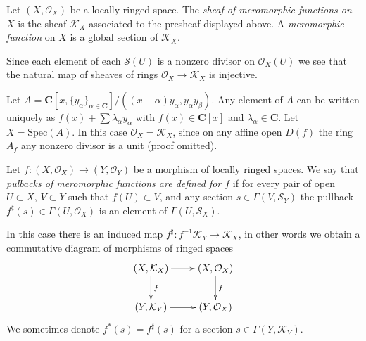 \begin{definition}
\label{definition-sheaf-meromorphic-functions}
Let $(X, \mathcal{O}_X)$ be a locally ringed space.
The {\it sheaf of meromorphic functions on $X$} is
the sheaf {\it $\mathcal{K}_X$} associated to the presheaf
displayed above. A {\it meromorphic function} on $X$
is a global section of $\mathcal{K}_X$.
\end{definition}

\noindent
Since each element of each $\mathcal{S}(U)$ is a nonzero divisor on
$\mathcal{O}_X(U)$ we see that the natural map of sheaves
of rings $\mathcal{O}_X \to \mathcal{K}_X$ is injective.

\begin{example}
\label{example-no-change}
Let $A = \mathbf{C}[x, \{y_\alpha\}_{\alpha \in \mathbf{C}}]/
((x - \alpha)y_\alpha, y_\alpha y_\beta)$. Any element of $A$
can be written uniquely as
$f(x) + \sum \lambda_\alpha y_\alpha$ with $f(x) \in \mathbf{C}[x]$
and $\lambda_\alpha \in \mathbf{C}$.
Let $X = \text{Spec}(A)$.
In this case $\mathcal{O}_X = \mathcal{K}_X$, since on
any affine open $D(f)$ the ring $A_f$ any nonzero divisor is
a unit (proof omitted).
\end{example}

\begin{definition}
\label{definition-pullback-meromorphic-sections}
Let $f : (X, \mathcal{O}_X) \to (Y, \mathcal{O}_Y)$ be a morphism
of locally ringed spaces. We say that {\it pulbacks of meromorphic
functions are defined for $f$} if for every pair of open
$U \subset X$, $V \subset Y$ such that $f(U) \subset V$, and any
section $s \in \Gamma(V, \mathcal{S}_Y)$ the pullback
$f^\sharp(s) \in \Gamma(U, \mathcal{O}_X)$ is an element
of $\Gamma(U, \mathcal{S}_X)$.
\end{definition}

\noindent
In this case there is an induced map
$f^\sharp : f^{-1}\mathcal{K}_Y \to \mathcal{K}_X$,
in other words we obtain a commutative diagram of morphisms
of ringed spaces
$$
\xymatrix{
(X, \mathcal{K}_X) \ar[r] \ar[d]^f &
(X, \mathcal{O}_X) \ar[d]^f \\
(Y, \mathcal{K}_Y) \ar[r] &
(Y, \mathcal{O}_X)
}
$$
We sometimes denote $f^*(s) = f^\sharp(s)$ for a
section $s \in \Gamma(Y, \mathcal{K}_Y)$.

